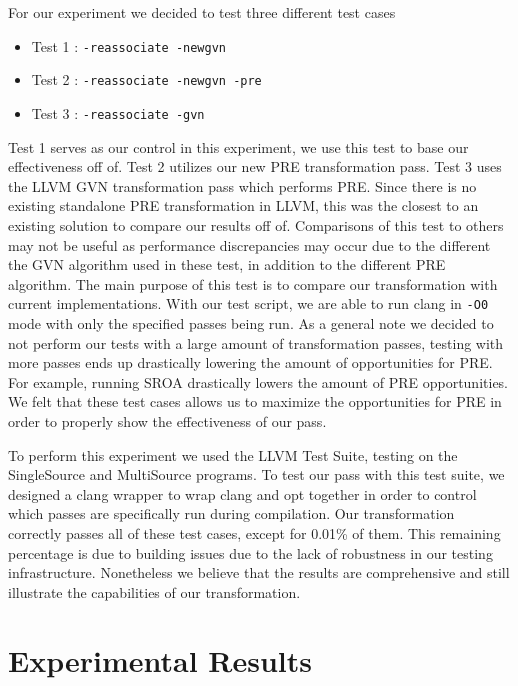 \documentclass[onecolumn,10pt]{journal}
\begin{document}
For our experiment we decided to test three different test cases

\begin{itemize}
\item Test 1 : \texttt{-reassociate -newgvn} 
\item Test 2 : \texttt{-reassociate -newgvn -pre}
\item Test 3 : \texttt{-reassociate -gvn}
\end{itemize}

Test 1 serves as our control in this experiment, we use this test to base our effectiveness off of. Test 2 utilizes our new PRE transformation pass. Test 3 uses the LLVM GVN transformation pass which performs PRE. Since there is no existing standalone PRE transformation in LLVM, this was the closest to an existing solution to compare our results off of. Comparisons of this test to others may not be useful as performance discrepancies may occur due to the different the GVN algorithm used in these test, in addition to the different PRE algorithm. The main purpose of this test is to compare our transformation with current implementations. With our test script, we are able to run clang in \texttt{-O0} mode with only the specified passes being run. As a general note we decided to not perform our tests with a large amount of transformation passes, testing with more passes ends up drastically lowering the amount of opportunities for PRE. For example, running SROA drastically lowers the amount of PRE opportunities. We felt that these test cases allows us to maximize the opportunities for PRE in order to properly show the effectiveness of our pass.

To perform this experiment we used the LLVM Test Suite, testing on the SingleSource and MultiSource programs. To test our pass with this test suite, we designed a clang wrapper to wrap clang and opt together in order to control which passes are specifically run during compilation. Our transformation correctly passes all of these test cases, except for 0.01\% of them. This remaining percentage is due to building issues due to the lack of robustness in our testing infrastructure. Nonetheless we believe that the results are comprehensive and still illustrate the capabilities of our transformation.

\section{Experimental Results}
\end{document}

